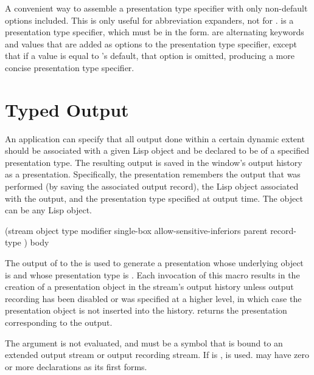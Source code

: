 A convenient way to assemble a presentation type specifier with only non-default
options included.  This is only useful for abbreviation expanders, not for
.   is a presentation type
specifier, which must be in the  form.
 are alternating keywords and values that are added as options to
the presentation type specifier, except that if a value is equal to
's default, that option is omitted, producing a more concise
presentation type specifier.


\section {Typed Output}

An application can specify that all output done within a certain dynamic extent
should be associated with a given Lisp object and be declared to be of a
specified presentation type.  The resulting output is saved in the window's
output history as a presentation.  Specifically, the presentation remembers the
output that was performed (by saving the associated output record), the Lisp
object associated with the output, and the presentation type specified at output
time.  The object can be any Lisp object.


 {(stream object type
                                          \key modifier single-box allow-sensitive-inferiors
                                               parent record-type \allow)
                                         \body body}

The output of  to the   is
used to generate a presentation whose underlying object is  and
whose presentation type is .  Each invocation of this macro results in
the creation of a presentation object in the stream's output history unless
output recording has been disabled or  was
specified at a higher level, in which case the presentation object is not
inserted into the history.   returns the
presentation corresponding to the output.

The  argument is not evaluated, and must be a symbol that is bound
to an extended output stream or output recording stream.  If  is
,  is used.  may have zero or more
declarations as its first forms.

